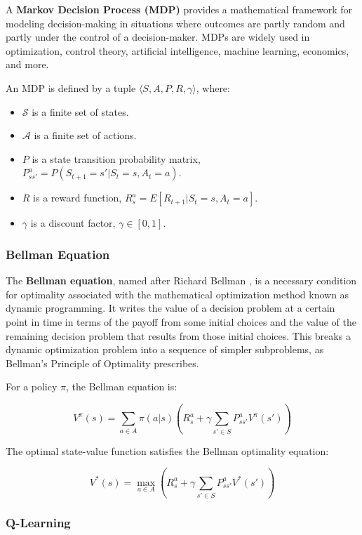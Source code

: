 \documentclass[10pt,letterpaper]{article}
\begin{document}
A \textbf{Markov Decision Process (MDP)} provides a mathematical framework for modeling decision-making in situations where outcomes are partly random and partly under the control of a decision-maker. MDPs are widely used in optimization, control theory, artificial intelligence, machine learning, economics, and more.

An MDP is defined by a tuple $\langle S, A, P, R, \gamma \rangle$, where:

\begin{itemize}
\item $\mathcal{S}$ is a finite set of states.
\item $\mathcal{A}$ is a finite set of actions.
\item $P$ is a state transition probability matrix, $P_{ss'}^a = P(S_{t+1} = s' | S_t = s, A_t = a)$.
\item $R$ is a reward function, $R_s^a = E[R_{t+1} | S_t = s, A_t = a]$.
\item $\gamma$ is a discount factor, $\gamma \in [0, 1]$.
\end{itemize}


\subsubsection{Bellman Equation}

The \textbf{Bellman equation}, named after Richard Bellman \cite{barron1989bellman}, is a necessary condition for optimality associated with the mathematical optimization method known as dynamic programming. It writes the value of a decision problem at a certain point in time in terms of the payoff from some initial choices and the value of the remaining decision problem that results from those initial choices. This breaks a dynamic optimization problem into a sequence of simpler subproblems, as Bellman's Principle of Optimality prescribes.

For a policy $\pi$, the Bellman equation is:

\[ V^\pi(s) = \sum_{a \in A} \pi(a|s) \left( R_s^a + \gamma \sum_{s' \in S} P_{ss'}^a V^\pi(s') \right) \]

The optimal state-value function satisfies the Bellman optimality equation:

\[ V^*(s) = \max_{a \in A} \left( R_s^a + \gamma \sum_{s' \in S} P_{ss'}^a V^*(s') \right) \]

\subsubsection{Q-Learning}
\end{document}
